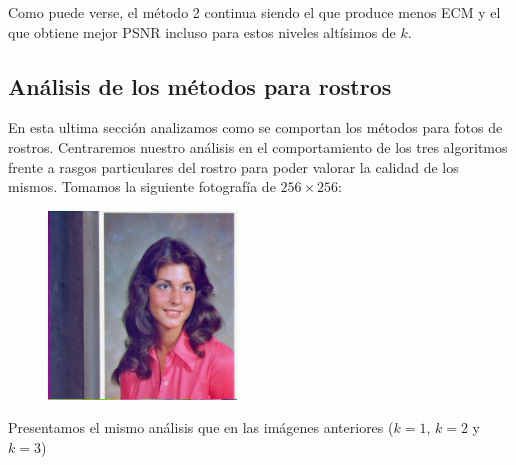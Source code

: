 Como puede verse, el método 2 continua siendo el que produce menos ECM y el que obtiene mejor PSNR incluso para estos niveles altísimos de $k$.

\subsection{Análisis de los métodos para rostros}


En esta ultima sección analizamos como se comportan los métodos para fotos de rostros. Centraremos nuestro análisis en el comportamiento de los tres algoritmos frente a rasgos particulares del rostro para poder valorar la calidad de los mismos. Tomamos la siguiente fotografía de $256\times 256$:

\begin{figure}[H]
\centering
\includegraphics[width=5cm]{fotos/rostro/orig.png}
\end{figure}

Presentamos el mismo análisis que en las imágenes anteriores ($k=1$, $k=2$ y $k=3$)

